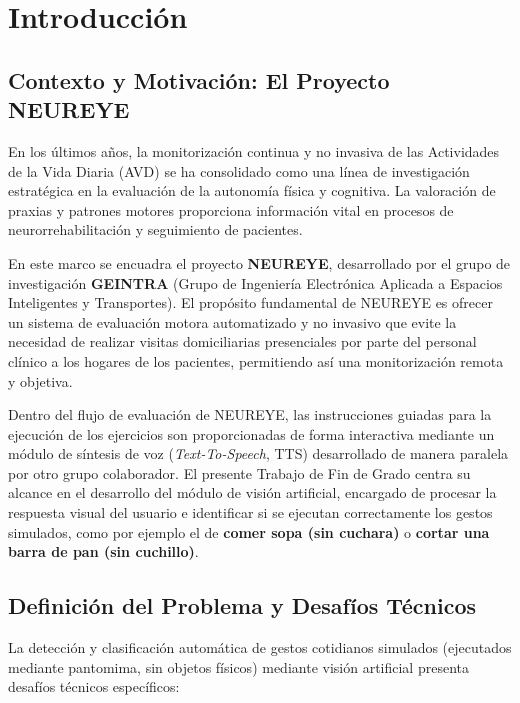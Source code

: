 \documentclass[11pt,a4paper,oneside]{article}
\begin{document}
		\section{Introducción}
		\label{sec:introduccion}
		
		\subsection{Contexto y Motivación: El Proyecto NEUREYE}
		\label{sec:contexto_neureye}
		En los últimos años, la monitorización continua y no invasiva de las Actividades de la Vida Diaria (AVD) se ha consolidado como una línea de investigación estratégica en la evaluación de la autonomía física y cognitiva. La valoración de praxias y patrones motores proporciona información vital en procesos de neurorrehabilitación y seguimiento de pacientes.
		
		En este marco se encuadra el proyecto \textbf{NEUREYE}, desarrollado por el grupo de investigación \textbf{GEINTRA} (Grupo de Ingeniería Electrónica Aplicada a Espacios Inteligentes y Transportes). El propósito fundamental de NEUREYE es ofrecer un sistema de evaluación motora automatizado y no invasivo que evite la necesidad de realizar visitas domiciliarias presenciales por parte del personal clínico a los hogares de los pacientes, permitiendo así una monitorización remota y objetiva.
		
		Dentro del flujo de evaluación de NEUREYE, las instrucciones guiadas para la ejecución de los ejercicios son proporcionadas de forma interactiva mediante un módulo de síntesis de voz (\textit{Text-To-Speech}, TTS) desarrollado de manera paralela por otro grupo colaborador. El presente Trabajo de Fin de Grado centra su alcance en el desarrollo del módulo de visión artificial, encargado de procesar la respuesta visual del usuario e identificar si se ejecutan correctamente los gestos simulados, como por ejemplo el de \textbf{comer sopa (sin cuchara)} o \textbf{cortar una barra de pan (sin cuchillo)}.
		
		\subsection{Definición del Problema y Desafíos Técnicos}
		\label{subsec:definicion_problema}
		
		La detección y clasificación automática de gestos cotidianos simulados (ejecutados mediante pantomima, sin objetos físicos) mediante visión artificial presenta desafíos técnicos específicos:
		
\end{document}

